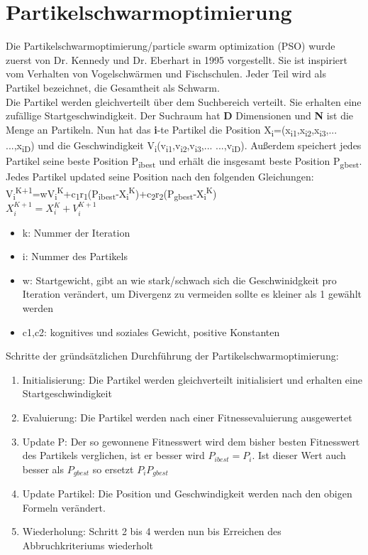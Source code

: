 \section{Partikelschwarmoptimierung}
Die Partikelschwarmoptimierung/particle swarm optimization (PSO) wurde zuerst von Dr. Kennedy und Dr. Eberhart in 1995 vorgestellt.
 Sie ist inspiriert vom Verhalten von Vogelschwärmen und Fischschulen. Jeder Teil wird als Partikel bezeichnet, die Gesamtheit als Schwarm.
\\ Die Partikel werden gleichverteilt über dem Suchbereich verteilt. Sie erhalten eine zufällige Startgeschwindigkeit. 
Der Suchraum hat \textbf{D} Dimensionen und \textbf{N} ist die Menge an Partikeln. Nun hat das \textbf{i}-te Partikel die Position X\textsubscript{i}=(x\textsubscript{i1},x\textsubscript{i2},x\textsubscript{i3},... ...,x\textsubscript{iD})
  und die Geschwindigkeit V\textsubscript{i}(v\textsubscript{i1},v\textsubscript{i2},v\textsubscript{i3},... ...,v\textsubscript{iD}). Außerdem speichert jedes Partikel seine beste Position P\textsubscript{ibest} und erhält die insgesamt beste Position P\textsubscript{gbest}. 
\\
Jedes Partikel updated seine Position nach den folgenden Gleichungen:\\
V\textsubscript{i}\textsuperscript{K+1}=wV\textsubscript{i}\textsuperscript{K}+c\textsubscript{1}r\textsubscript{1}(P\textsubscript{ibest}-X\textsubscript{i}\textsuperscript{K})+c\textsubscript{2}r\textsubscript{2}(P\textsubscript{gbest}-X\textsubscript{i}\textsuperscript{K})\\
$X_i^{K+1}=X_i^K+V_i^{K+1}$
\begin{itemize}

  \item k: Nummer der Iteration
  \item i: Nummer des Partikels
  \item w: Startgewicht, gibt an wie stark/schwach sich die Geschwinidgkeit pro Iteration verändert, um Divergenz zu vermeiden sollte es  kleiner als 1 gewählt werden
  \item c1,c2: kognitives und soziales Gewicht, positive Konstanten

\end{itemize}
Schritte der gründsätzlichen Durchführung der Partikelschwarmoptimierung:
\begin{enumerate}
  \item Initialisierung: Die Partikel werden gleichverteilt initialisiert und erhalten eine Startgeschwindigkeit
  \item Evaluierung: Die Partikel werden nach einer Fitnessevaluierung ausgewertet 
  \item Update P: Der so gewonnene Fitnesswert wird dem bisher besten Fitnesswert des Partikels verglichen, ist er besser wird $P_{ibest}=P_i$. Ist dieser Wert auch besser als $P_{gbest}$ so ersetzt $P_i P_{gbest}$
  \item Update Partikel: Die Position und Geschwindigkeit werden nach den obigen Formeln verändert.
  \item Wiederholung: Schritt 2 bis 4 werden nun bis Erreichen des Abbruchkriteriums wiederholt
\end{enumerate}\\

